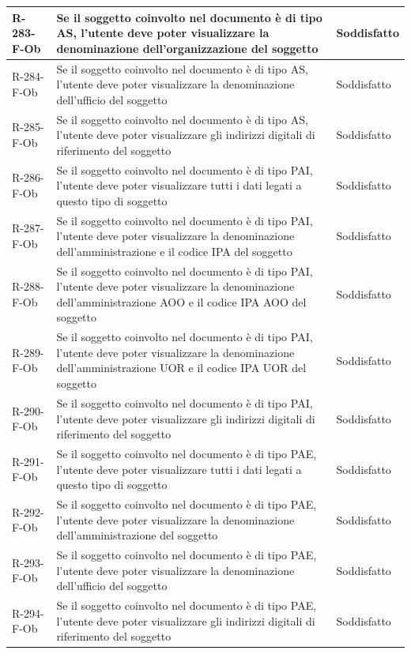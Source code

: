 \begin{longtable}{|p{2.5cm}|p{9.5cm}|p{2.5cm}|}
\hline
R-283-F-Ob & Se il soggetto coinvolto nel documento è di tipo AS, l'utente deve poter visualizzare la denominazione dell'organizzazione del soggetto & Soddisfatto \\
\hline
R-284-F-Ob & Se il soggetto coinvolto nel documento è di tipo AS, l'utente deve poter visualizzare la denominazione dell'ufficio del soggetto & Soddisfatto \\
\hline
R-285-F-Ob & Se il soggetto coinvolto nel documento è di tipo AS, l'utente deve poter visualizzare gli indirizzi digitali di riferimento del soggetto & Soddisfatto \\
\hline
R-286-F-Ob &Se il soggetto coinvolto nel documento è di tipo PAI, l'utente deve poter visualizzare tutti i dati legati a questo tipo di soggetto& Soddisfatto \\
\hline
R-287-F-Ob & Se il soggetto coinvolto nel documento è di tipo PAI, l'utente deve poter visualizzare la denominazione dell'amministrazione e il codice IPA del soggetto & Soddisfatto \\
\hline
R-288-F-Ob & Se il soggetto coinvolto nel documento è di tipo PAI, l'utente deve poter visualizzare la denominazione dell'amministrazione AOO e il codice IPA AOO del soggetto & Soddisfatto \\
\hline
R-289-F-Ob & Se il soggetto coinvolto nel documento è di tipo PAI, l'utente deve poter visualizzare la denominazione dell'amministrazione UOR e il codice IPA UOR del soggetto & Soddisfatto \\
\hline
R-290-F-Ob & Se il soggetto coinvolto nel documento è di tipo PAI, l'utente deve poter visualizzare gli indirizzi digitali di riferimento del soggetto & Soddisfatto \\
\hline
R-291-F-Ob & Se il soggetto coinvolto nel documento è di tipo PAE, l'utente deve poter visualizzare tutti i dati legati a questo tipo di soggetto & Soddisfatto \\
\hline
R-292-F-Ob & Se il soggetto coinvolto nel documento è di tipo PAE, l'utente deve poter visualizzare la denominazione dell'amministrazione del soggetto & Soddisfatto \\
\hline
R-293-F-Ob & Se il soggetto coinvolto nel documento è di tipo PAE, l'utente deve poter visualizzare la denominazione dell'ufficio del soggetto & Soddisfatto \\
\hline
R-294-F-Ob & Se il soggetto coinvolto nel documento è di tipo PAE, l'utente deve poter visualizzare gli indirizzi digitali di riferimento del soggetto & Soddisfatto \\

\end{longtable}
